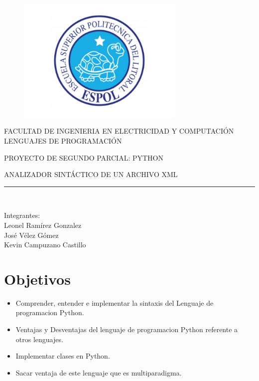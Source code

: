 \documentclass[a4paper,openright,12pt]{report}
\begin{document}
\begin{titlepage}

\begin{center}
\vspace*{-1in}
\begin{figure}[htb]
\begin{center}
\includegraphics[width=8cm]{./imagenes/espol.jpg}
\end{center}
\end{figure}
FACULTAD DE INGENIERIA EN ELECTRICIDAD Y COMPUTACIÓN\\
\vspace*{0.15in}
LENGUAJES DE PROGRAMACIÓN\\
\vspace*{0.6in}
\begin{large}
PROYECTO DE SEGUNDO PARCIAL: PYTHON
\end{large}
\vspace*{0.4in}
\begin{large}
ANALIZADOR SINTÁCTICO DE UN ARCHIVO XML\\
\end{large}
\vspace*{0.3in}
\rule{80mm}{0.1mm}\\
\vspace*{0.1in}
\begin{large}
Integrantes:\\Leonel Ramírez Gonzalez\\José Vélez Gómez\\Kevin Campuzano Castillo\\ 
\end{large}
\end{center}
\end{titlepage}

\tableofcontents
\chapter{Objetivos}
\begin{itemize}
\item{Comprender, entender e implementar la sintaxis del Lenguaje de programacion Python.}
\item{Ventajas y Desventajas del lenguaje de programacion Python referente a otros lenguajes.}
\item{Implementar clases en Python.}
\item{Sacar ventaja de este lenguaje que es multiparadigma.}
\end{itemize}
\end{document}
